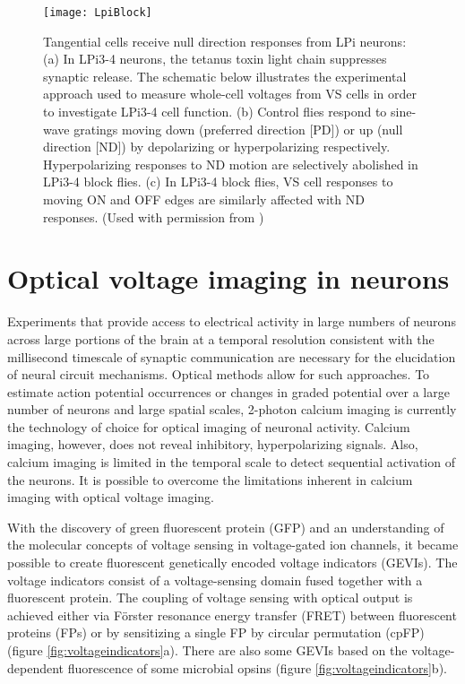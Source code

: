 \begin{figure}
\centering
\hspace*{-1cm} 
\texttt{[image: LpiBlock]}
\caption[Tangential cells receive null direction responses from LPi neurons] {Tangential cells receive null direction responses from LPi neurons: (a) In LPi3-4 neurons, the tetanus toxin light chain suppresses synaptic release. The schematic below illustrates the experimental approach used to measure whole-cell voltages from VS cells in order to investigate LPi3-4 cell function. (b) Control flies respond to sine-wave gratings moving down (preferred direction [PD]) or up (null direction [ND]) by depolarizing or hyperpolarizing respectively. Hyperpolarizing responses to ND motion are selectively abolished in LPi3-4 block flies. (c) In LPi3-4 block flies, VS cell responses to moving ON and OFF edges are similarly affected with ND responses. (Used with permission from \parencite{Mauss2015})} 
\label{fig:lpiblock}
\end{figure}

\section{Optical voltage imaging in neurons}
Experiments that provide access to electrical activity in large numbers of neurons across large portions of the brain at a temporal resolution consistent with the millisecond timescale of synaptic communication are necessary for the elucidation of neural circuit mechanisms. Optical methods allow for such approaches. To estimate action potential occurrences or changes in graded potential over a large number of neurons and large spatial scales, 2-photon calcium imaging is currently the technology of choice for optical imaging of neuronal activity. Calcium imaging, however, does not reveal inhibitory, hyperpolarizing signals. Also, calcium imaging is limited in the temporal scale to detect sequential activation of the neurons. It is possible to overcome the limitations inherent in calcium imaging with optical voltage imaging.

With the discovery of green fluorescent protein (GFP) and an understanding of the molecular concepts of voltage sensing in voltage-gated ion channels, it became possible to create fluorescent genetically encoded voltage indicators (GEVIs). The voltage indicators consist of a voltage-sensing domain fused together with a fluorescent protein. The coupling of voltage sensing with optical output is achieved either via Förster resonance energy transfer (FRET) between fluorescent proteins (FPs) or by sensitizing a single FP by circular permutation (cpFP) (figure \ref{fig:voltageindicators}a). There are also some GEVIs based on the voltage-dependent fluorescence of some microbial opsins (figure \ref{fig:voltageindicators}b).

